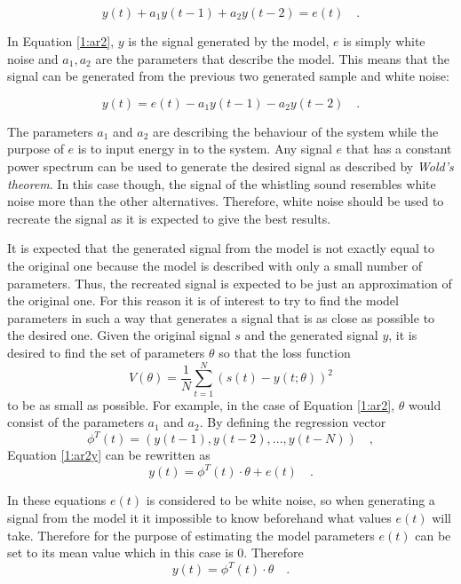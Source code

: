 \documentclass{IEEEtran}
\begin{document}
\begin{equation}
  \label{1:ar2}
  y(t) + a_1 y(t-1) + a_2 y(t-2) = e(t) \quad .
\end{equation}

In Equation \ref{1:ar2}, $y$ is the signal generated by the model, $e$ is
simply white noise and $a_1, a_2$ are the parameters that describe the
model. This means that the signal can be generated from the previous two
generated sample and white noise:

\begin{equation}
  \label{1:ar2y}
  y(t) = e(t) - a_1 y(t-1) - a_2 y(t-2)\quad .
\end{equation}

The parameters $a_1$ and $a_2$ are describing the behaviour of the system
while the purpose of $e$ is to input energy in to the system. Any signal
$e$ that has a constant power spectrum can be used to generate the desired
signal as described by \textit{Wold's theorem}\cite{signalproc}. In this
case though, the signal of the whistling sound resembles white noise more
than the other alternatives. Therefore, white noise should be used to
recreate the signal as it is expected to give the best results.

It is expected that the generated signal from the model is not exactly
equal to the original one because the model is described with only a small
number of parameters. Thus, the recreated signal is expected to be just an
approximation of the original one. For this reason it is of interest to
try to find the model parameters in such a way that generates a signal
that is as close as possible to the desired one. Given the original signal
$s$ and the generated signal $y$, it is desired to find the set of
parameters $\theta$ so that the loss function
\begin{equation}
  \label{1:loss}
  V(\theta)  = \frac{1}{N}\sum_{t=1}^{N}(s(t) - y(t; \theta))^2
\end{equation}
to be as small as possible. For example, in the case of Equation \ref{1:ar2},
$\theta$ would consist of the parameters $a_1$ and $a_2$. By defining
the regression vector
\begin{equation}
  \phi^T(t) = (y(t-1), y(t-2), ... , y(t-N)) \quad ,
\end{equation}
Equation \ref{1:ar2y} can be rewritten as
\begin{equation}
  y(t) = \phi^T(t)\cdot\theta + e(t) \quad .
\end{equation}

In these equations $e(t)$ is considered to be white noise, so when
generating a signal from the model it it impossible to know beforehand
what values $e(t)$ will take. Therefore for the purpose of estimating
the model parameters $e(t)$ can be set to its mean value which in this
case is $0$. Therefore
\begin{equation}
  \label{1:esty}
  y(t) = \phi^T(t)\cdot\theta \quad .
\end{equation}
\end{document}
